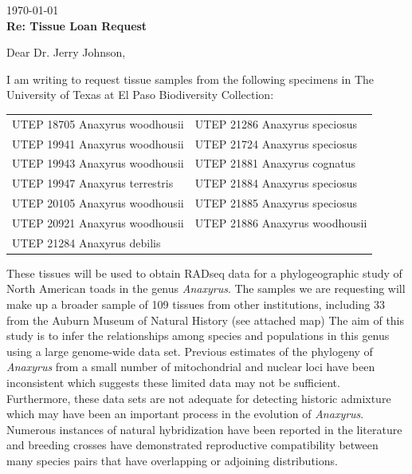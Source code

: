 \documentclass[fontsize=11pt,]{article}
\begin{document}
\vspace*{-3\baselineskip}
\BgThispage
\hfill \today\\
\vspace{2mm}
\textbf{Re: Tissue Loan Request}\\
\vspace{2mm}

Dear Dr. Jerry Johnson, \\

\vspace{2mm}

I am writing to request tissue samples from the following specimens in
The University of Texas at El Paso Biodiversity Collection:


\vspace*{-2mm}

\begin{table}[h]
\begin{tabular}{ll}

    UTEP 18705 Anaxyrus woodhousii  &  UTEP 21286 Anaxyrus speciosus \\
    UTEP 19941 Anaxyrus woodhousii  &  UTEP 21724 Anaxyrus speciosus \\
    UTEP 19943 Anaxyrus woodhousii  &  UTEP 21881 Anaxyrus cognatus \\
    UTEP 19947 Anaxyrus terrestris  &  UTEP 21884 Anaxyrus speciosus \\
    UTEP 20105 Anaxyrus woodhousii  &  UTEP 21885 Anaxyrus speciosus \\
    UTEP 20921 Anaxyrus woodhousii  &  UTEP 21886 Anaxyrus woodhousii \\
    UTEP 21284 Anaxyrus debilis  &  \\

\end{tabular}
\end{table}

\vspace*{-2mm}

These tissues will be used to obtain RADseq data for a phylogeographic study of
North American toads in the genus \textit{Anaxyrus}.
The samples we are requesting will make up a broader sample of 109 tissues from 
other institutions, including 33 from the Auburn Museum of Natural History (see attached map)
The aim of this study is to infer the relationships among species and
populations in this genus using a large genome-wide data set.
Previous estimates of the phylogeny of \textit{Anaxyrus} 
from a small number of mitochondrial and nuclear loci have been inconsistent  
which suggests these limited data may not be sufficient.
Furthermore, these data sets are not adequate for detecting historic
admixture which may have been an important process in the evolution of
\textit{Anaxyrus}.
Numerous instances of natural hybridization have been reported in the literature
and breeding crosses have demonstrated reproductive compatibility between many
species pairs that have overlapping or adjoining distributions. \\
\end{document}
